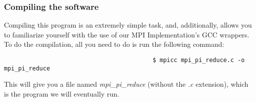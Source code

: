 \documentclass[]{article}
\begin{document}
                                          \subsubsection{Compiling the software}
                                          Compiling this program is an extremely simple task, and, additionally, allows you to familiarize yourself with the use of our MPI 
                                          Implementation's GCC wrappers. To do the compilation, all you need to do is run the following command:
                                          \begin{lstlisting}
                                          $ mpicc mpi_pi_reduce.c -o mpi_pi_reduce
                                          \end{lstlisting}
                                          This will give you a file named \textit{mpi\_pi\_reduce} (without the \textit{.c} extension), which is the program we will eventually 
                                          run.
\end{document}
